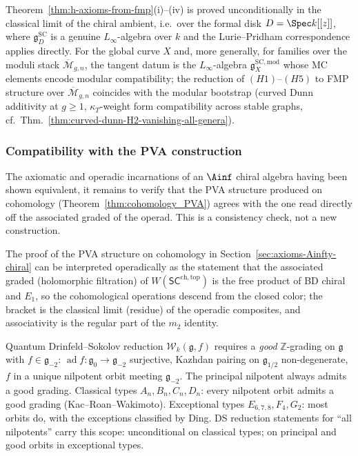 \begin{remark}[Scope]
\label{rem:fmp-scope}
Theorem~\ref{thm:h-axioms-from-fmp}(i)--(iv) is proved
unconditionally in the classical limit of the chiral ambient,
i.e.\ over the formal disk $D = \Spec k[[z]]$, where
$\mathfrak g^{\mathrm{SC}}_D$ is a genuine $L_\infty$-algebra over
$k$ and the Lurie--Pridham correspondence applies directly. For
the global curve $X$ and, more generally, for families over the
moduli stack $\overline{\mathcal M}_{g,n}$, the tangent datum is
the $L_\infty$-algebra
$\mathfrak g^{\mathrm{SC},\mathrm{mod}}_X$ whose MC elements
encode modular compatibility; the reduction of $(H1)$--$(H5)$ to
FMP structure over $\overline{\mathcal M}_{g,n}$ coincides with
the modular bootstrap (curved Dunn additivity at
$g\ge 1$, $\kappa_T$-weight form compatibility across stable
graphs, cf.~Thm.~\ref{thm:curved-dunn-H2-vanishing-all-genera}).
\end{remark}

\subsubsection{Compatibility with the PVA construction}
\label{subsec:compat-PVA}

The axiomatic and operadic incarnations of an $\Ainf$ chiral
algebra having been shown equivalent, it remains to verify that
the PVA structure produced on cohomology
(Theorem~\ref{thm:cohomology_PVA}) agrees with the one read
directly off the associated graded of the operad. This is a
consistency check, not a new construction.

The proof of the PVA structure on cohomology in
Section~\ref{sec:axioms-Ainfty-chiral} can be interpreted
operadically as the statement that the associated graded
(holomorphic filtration) of $W(\mathsf{SC}^{\mathrm{ch,top}})$ is
the free product of BD chiral and $E_1$, so the cohomological
operations descend from the closed color; the bracket is the
classical limit (residue) of the operadic composites, and
associativity is the regular part of the $m_2$ identity.

\begin{remark}\label{rem:ds-good-grading-scope}
Quantum Drinfeld--Sokolov reduction $\mathcal{W}_k(\mathfrak{g}, f)$ requires a \emph{good} $\mathbb{Z}$-grading on $\mathfrak{g}$ with $f \in \mathfrak{g}_{-2}$: $\operatorname{ad} f \colon \mathfrak{g}_0 \to \mathfrak{g}_{-2}$ surjective, Kazhdan pairing on $\mathfrak{g}_{1/2}$ non-degenerate, $f$ in a unique nilpotent orbit meeting $\mathfrak{g}_{-2}$. The principal nilpotent always admits a good grading. Classical types $A_n, B_n, C_n, D_n$: every nilpotent orbit admits a good grading (Kac--Roan--Wakimoto). Exceptional types $E_{6,7,8}, F_4, G_2$: most orbits do, with the exceptions classified by Ding. DS reduction statements for ``all nilpotents'' carry this scope: unconditional on classical types; on principal and good orbits in exceptional types.
\end{remark}

